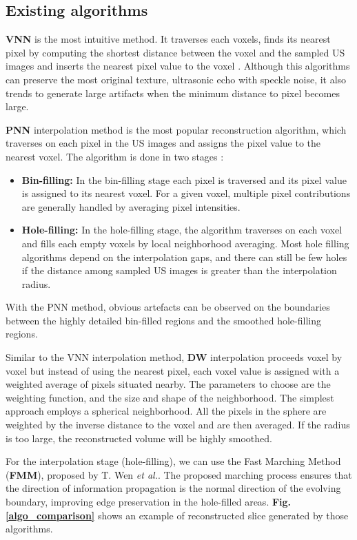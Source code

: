 \documentclass[12pt,journal,compsoc]{IEEEtran}
\begin{document}
\subsection{Existing algorithms}

\textbf{VNN} is the most intuitive method. It traverses each voxels, finds its nearest pixel by computing the shortest distance between the voxel and the sampled US images and inserts the nearest pixel value to the voxel\textbf{ \cite{13}}.
Although this algorithms can preserve the most original texture, ultrasonic echo with speckle noise, it also trends to generate large artifacts when the minimum distance to pixel becomes large.\par

\textbf{PNN} interpolation method is the most popular reconstruction algorithm, which traverses on each pixel in the US images and assigns the pixel value to the nearest voxel.
The algorithm is done in two stages :
\begin{itemize}
	\item \textbf{Bin-filling:} In the bin-filling stage each pixel is traversed and its pixel value is assigned to its nearest voxel. For a given voxel, multiple pixel contributions are generally handled by averaging pixel intensities.  
	\item \textbf{Hole-filling:} In the hole-filling stage, the algorithm traverses on each voxel and fills each empty voxels by local neighborhood averaging. Most hole filling algorithms depend on the interpolation gaps, and there can still be few holes if the distance among sampled US images is greater than the interpolation radius. 
\end{itemize}
With the PNN method, obvious artefacts can be observed on the boundaries between the highly detailed bin-filled regions and the smoothed hole-filling regions.\par

Similar to the VNN interpolation method, \textbf{DW} interpolation proceeds voxel by voxel but instead of using the nearest pixel, each voxel value is assigned with a weighted average of pixels situated nearby. The parameters to choose are the weighting function, and the size and shape of the neighborhood. The simplest approach employs a spherical neighborhood. All the pixels in the sphere are weighted by the inverse distance to the voxel and are then averaged. If the radius is too large, the reconstructed volume will be highly smoothed.

For the interpolation stage (hole-filling), we can use the Fast Marching Method (\textbf{FMM}), proposed by T. Wen \textit{et al.}\textbf{\cite{2}}. The proposed marching process ensures that the direction of information propagation is the normal direction of the evolving boundary, improving edge preservation in the hole-filled areas.
\textbf{Fig.\ref{algo_comparison}} shows an example of reconstructed slice generated by those algorithms.
\end{document}
